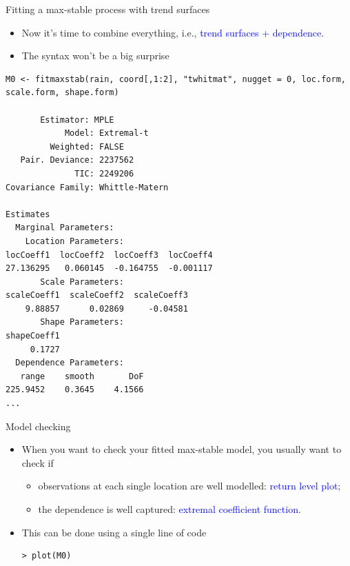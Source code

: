 \documentclass[mode=present,style=simple,paper=screen]{powerdot}
\theoremstyle{plain}%
\theoremstyle{definition}
\theoremstyle{remark}
\begin{document}
\begin{wideslide}[toc=Fitting,method=direct]{Fitting a max-stable process with trend
    surfaces}
  \begin{itemize}
  \item Now it's time to combine everything, i.e.,
    \textcolor{blue}{trend surfaces + dependence}.
  \item The syntax won't be a big surprise
  \end{itemize}
  {\tiny
\begin{verbatim}
M0 <- fitmaxstab(rain, coord[,1:2], "twhitmat", nugget = 0, loc.form, scale.form, shape.form)

       Estimator: MPLE
            Model: Extremal-t
         Weighted: FALSE
   Pair. Deviance: 2237562
              TIC: 2249206
Covariance Family: Whittle-Matern

Estimates
  Marginal Parameters:
    Location Parameters:
locCoeff1  locCoeff2  locCoeff3  locCoeff4
27.136295   0.060145  -0.164755  -0.001117
       Scale Parameters:
scaleCoeff1  scaleCoeff2  scaleCoeff3
    9.88857      0.02869     -0.04581
       Shape Parameters:
shapeCoeff1
     0.1727
  Dependence Parameters:
   range    smooth       DoF
225.9452    0.3645    4.1566
...
\end{verbatim}
}
\end{wideslide}

\begin{wideslide}[method=direct]{Model checking \citep{Davison2012}}
  \begin{minipage}[l]{.49\linewidth}
    \begin{itemize}
    \item When you want to check your fitted max-stable model, you
      usually want to check if
      \begin{itemize}
      \item observations at each single location are well modelled:
        \textcolor{blue}{return level plot};
      \item the dependence is well captured: \textcolor{blue}{extremal
          coefficient function}.
      \end{itemize}
    \item This can be done using a single line of code
\begin{verbatim}
> plot(M0)
\end{verbatim}
    \end{itemize}
  \end{minipage}
  \hfill
\end{wideslide}
\end{document}
